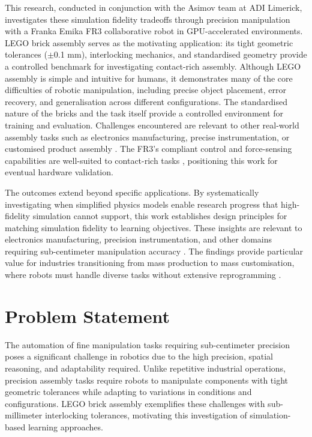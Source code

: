 \documentclass[12pt,a4paper,oneside]{report}
\begin{document}
This research, conducted in conjunction with the Asimov team at ADI Limerick, investigates these simulation fidelity tradeoffs through precision manipulation with a Franka Emika FR3 collaborative robot in GPU-accelerated environments. LEGO brick assembly serves as the motivating application: its tight geometric tolerances ($\pm$0.1 mm), interlocking mechanics, and standardised geometry provide a controlled benchmark for investigating contact-rich assembly. Although LEGO assembly is simple and intuitive for humans, it demonstrates many of the core difficulties of robotic manipulation, including precise object placement, error recovery, and generalisation across different configurations. The standardised nature of the bricks and the task itself provide a controlled environment for training and evaluation. Challenges encountered are relevant to other real-world assembly tasks such as electronics manufacturing, precise instrumentation, or customised product assembly \cite{zhuRobosuiteModularSimulation2025}. The FR3's compliant control and force-sensing capabilities are well-suited to contact-rich tasks \cite{zhangFrankaInterfaceFrankaPyPythonbased2020}, positioning this work for eventual hardware validation.

The outcomes extend beyond specific applications. By systematically investigating when simplified physics models enable research progress that high-fidelity simulation cannot support, this work establishes design principles for matching simulation fidelity to learning objectives. These insights are relevant to electronics manufacturing, precision instrumentation, and other domains requiring sub-centimeter manipulation accuracy \cite{TrendsChallengesRobot2019}. The findings provide particular value for industries transitioning from mass production to mass customisation, where robots must handle diverse tasks without extensive reprogramming \cite{automate.orgBiggestAutomationChallenges2025}.

\section{Problem Statement}

The automation of fine manipulation tasks requiring sub-centimeter precision poses a significant challenge in robotics due to the high precision, spatial reasoning, and adaptability required. Unlike repetitive industrial operations, precision assembly tasks require robots to manipulate components with tight geometric tolerances while adapting to variations in conditions and configurations. LEGO brick assembly exemplifies these challenges with sub-millimeter interlocking tolerances, motivating this investigation of simulation-based learning approaches.
\end{document}
